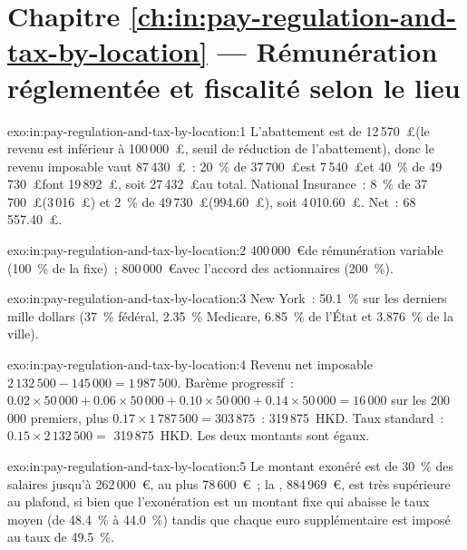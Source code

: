 \section*{Chapitre \ref{ch:in:pay-regulation-and-tax-by-location} --- Rémunération réglementée et fiscalité selon le lieu}

\begin{solution}{exo:in:pay-regulation-and-tax-by-location:1}
L'abattement est de 12\,570~\pounds (le revenu est inférieur à 100\,000~\pounds, seuil de réduction de l'abattement), donc le revenu imposable vaut 87\,430~\pounds~: 20~\% de
37\,700~\pounds est 7\,540~\pounds et 40~\% de 49\,730~\pounds font 19\,892~\pounds, soit 27\,432~\pounds au total. National Insurance~: 8~\% de
37\,700~\pounds (3\,016~\pounds) et 2~\% de 49\,730~\pounds (994.60~\pounds), soit 4\,010.60~\pounds. Net~: 68\,557.40~\pounds.
\end{solution}

\begin{solution}{exo:in:pay-regulation-and-tax-by-location:2}
400\,000~\euro de rémunération variable (100~\% de la fixe)~; 800\,000~\euro avec l'accord des actionnaires (200~\%).
\end{solution}

\begin{solution}{exo:in:pay-regulation-and-tax-by-location:3}
New York~: 50.1~\% sur les derniers mille dollars (37~\% fédéral, 2.35~\% Medicare, 6.85~\% de l'État et 3.876~\% de la ville).
\end{solution}

\begin{solution}{exo:in:pay-regulation-and-tax-by-location:4}
Revenu net imposable $2\,132\,500-145\,000=1\,987\,500$. Barème progressif~: $0.02\times50\,000+0.06\times50\,000+0.10\times50\,000
+0.14\times50\,000=16\,000$ sur les 200\,000 premiers, plus $0.17\times1\,787\,500=303\,875$~: 319\,875~HKD. Taux standard~:
$0.15\times2\,132\,500=$ 319\,875~HKD. Les deux montants sont égaux.
\end{solution}

\begin{solution}{exo:in:pay-regulation-and-tax-by-location:5}
Le montant exonéré est de 30~\% des salaires jusqu'à 262\,000~\euro, au plus 78\,600~\euro~; la , 884\,969~\euro, est très supérieure au
plafond, si bien que l'exonération est un montant fixe qui abaisse le taux moyen (de 48.4~\% à 44.0~\%) tandis que chaque euro supplémentaire est
imposé au taux de 49.5~\%.
\end{solution}

